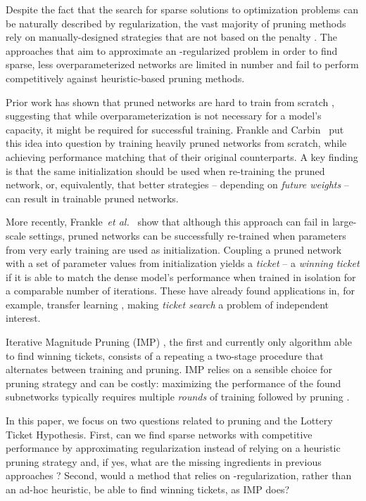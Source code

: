 \documentclass{article}
\newcommand{\citep}[1]{\cite{#1}}
\newcommand{\citet}[1]{\cite{#1}}
\newcommand{\etal}{\textit{et al.}}
\begin{document}
Despite the fact that the search for sparse solutions to optimization problems can be naturally described by  regularization, the vast majority of pruning methods rely on manually-designed strategies that are not based on the  penalty \cite{magnitudepruning, gmp, dnw, softweight}. The approaches that aim to approximate an -regularized problem in order to find sparse, less overparameterized networks are limited in number \cite{l0bernoulli, sparsityl0} and fail to perform competitively against heuristic-based pruning methods.

Prior work has shown that pruned networks are hard to train from scratch \citep{magnitudepruning}, suggesting that while overparameterization is not necessary for a model's capacity, it might be required for successful training. Frankle and Carbin~\citet{lth} put this idea into question by training heavily pruned networks from scratch, while achieving performance matching that of their original counterparts. A key finding is that the same initialization should be used when re-training the pruned network, or, equivalently, that better strategies -- depending on \emph{future weights} -- can result in trainable pruned networks.

More recently, Frankle~\etal~\cite{linearmode} show that although this approach can fail in large-scale settings, pruned networks can be successfully re-trained when parameters from very early training are used as initialization. Coupling a pruned network with a set of parameter values from initialization yields a \textit{ticket} -- a \textit{winning ticket} if it is able to match the dense model's performance when trained in isolation for a comparable number of iterations. These have already found applications in, for example, transfer learning \citep{generaltickets, transfertickets, transtickets2}, making \textit{ticket search} a problem of independent interest.

Iterative Magnitude Pruning (IMP) \citep{lth}, the first and currently only algorithm able to find winning tickets, consists of a repeating a two-stage procedure that alternates between training and pruning. IMP relies on a sensible choice for pruning strategy \cite{deconstructing} and can be costly: maximizing the performance of the found subnetworks typically requires multiple \textit{rounds} of training followed by pruning \cite{lth2}.

In this paper, we focus on two questions related to pruning and the Lottery Ticket Hypothesis. First, can we find sparse networks with competitive performance by approximating  regularization instead of relying on a heuristic pruning strategy and, if yes, what are the missing ingredients in previous approaches \cite{l0bernoulli, sparsityl0}? Second, would a method that relies on -regularization, rather than an ad-hoc heuristic, be able to find winning tickets, as IMP does?
\end{document}
